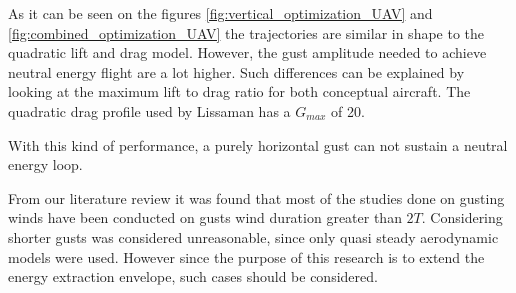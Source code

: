 \FloatBarrier

As it can be seen on the figures \ref{fig:vertical_optimization_UAV} and \ref{fig:combined_optimization_UAV} the trajectories are similar in shape to the quadratic lift and drag model.
However, the gust amplitude needed to achieve neutral energy flight are a lot higher.
Such differences can be explained by looking at the maximum lift to drag ratio for both conceptual aircraft.
The quadratic drag profile used by Lissaman has a $G_{max}$ of 20.

\FloatBarrier

\par With this kind of performance, a purely horizontal gust can not sustain a neutral energy loop.

\FloatBarrier

%



From our literature review it was found that most of the studies done on gusting winds have been conducted on gusts wind duration greater than $2T$.
Considering shorter gusts was considered unreasonable, since only quasi steady aerodynamic models were used. 
However since the purpose of this research is to extend the energy extraction envelope, such cases should be considered.

